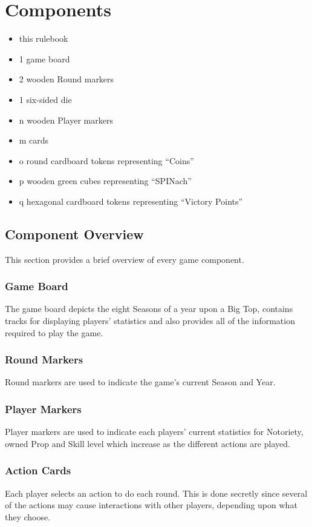 \chapter{Components}
	\begin{itemize}
		\item this rulebook
		\item 1 game board
		\item 2 wooden Round markers
		\item 1 six-sided die
		\item n wooden Player markers %
		\item m cards %
		\item o round cardboard tokens representing ``Coins''
		\item p wooden green cubes representing ``SPINach''
		\item q hexagonal cardboard tokens representing ``Victory Points''
	\end{itemize}
	\section{Component Overview}
This section provides a brief overview of every game component.
		\subsection{Game Board}
The game board depicts the eight Seasons of a year upon a Big Top, contains tracks for displaying players' statistics and also provides all of the information required to play the game.
		\subsection{Round Markers}
Round markers are used to indicate the game's current Season and Year.
		\subsection{Player Markers}
Player markers are used to indicate each players' current statistics for Notoriety, owned Prop and Skill level which increase as the different actions are played.
		\subsection{Action Cards}
Each player selects an action to do each round. 
This is done secretly since several of the actions may cause interactions with other players, depending upon what they choose.
